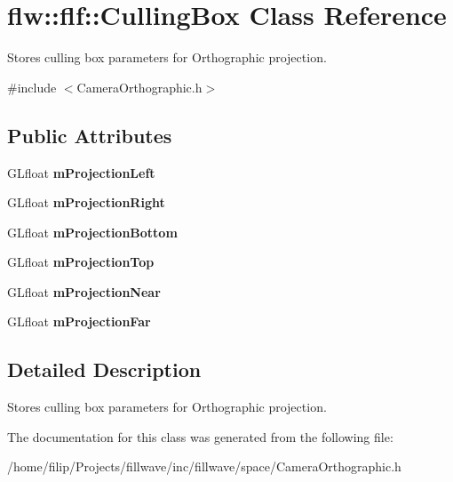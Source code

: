 \hypertarget{structflw_1_1flf_1_1CullingBox}{}\section{flw\+:\+:flf\+:\+:Culling\+Box Class Reference}
\label{structflw_1_1flf_1_1CullingBox}


Stores culling box parameters for Orthographic projection.  




{\ttfamily \#include $<$Camera\+Orthographic.\+h$>$}

\subsection*{Public Attributes}
\begin{DoxyCompactItemize}
\item 
G\+Lfloat {\bfseries m\+Projection\+Left}\hypertarget{structflw_1_1flf_1_1CullingBox_ac5c2e8a66f067c2df77d106ca3581dff}{}\label{structflw_1_1flf_1_1CullingBox_ac5c2e8a66f067c2df77d106ca3581dff}

\item 
G\+Lfloat {\bfseries m\+Projection\+Right}\hypertarget{structflw_1_1flf_1_1CullingBox_a4da4f46dd3c7db0917ad2d7cfb898969}{}\label{structflw_1_1flf_1_1CullingBox_a4da4f46dd3c7db0917ad2d7cfb898969}

\item 
G\+Lfloat {\bfseries m\+Projection\+Bottom}\hypertarget{structflw_1_1flf_1_1CullingBox_a023494058764b2e32487c74ca6f0ca5a}{}\label{structflw_1_1flf_1_1CullingBox_a023494058764b2e32487c74ca6f0ca5a}

\item 
G\+Lfloat {\bfseries m\+Projection\+Top}\hypertarget{structflw_1_1flf_1_1CullingBox_a00c8442039df52349d7270b380fa6107}{}\label{structflw_1_1flf_1_1CullingBox_a00c8442039df52349d7270b380fa6107}

\item 
G\+Lfloat {\bfseries m\+Projection\+Near}\hypertarget{structflw_1_1flf_1_1CullingBox_a83129de939fbe7d4dd1cb53d3d6a05ed}{}\label{structflw_1_1flf_1_1CullingBox_a83129de939fbe7d4dd1cb53d3d6a05ed}

\item 
G\+Lfloat {\bfseries m\+Projection\+Far}\hypertarget{structflw_1_1flf_1_1CullingBox_a23e77401e6e69cdc66985ae21ddf4251}{}\label{structflw_1_1flf_1_1CullingBox_a23e77401e6e69cdc66985ae21ddf4251}

\end{DoxyCompactItemize}


\subsection{Detailed Description}
Stores culling box parameters for Orthographic projection. 

The documentation for this class was generated from the following file\+:\begin{DoxyCompactItemize}
\item 
/home/filip/\+Projects/fillwave/inc/fillwave/space/Camera\+Orthographic.\+h\end{DoxyCompactItemize}
